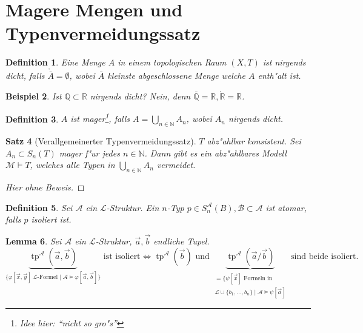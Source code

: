 \documentclass[a4paper,12pt,numbers=noenddot,parskip=full]{scrartcl}
\newcommand{\setN}{\mathbb{N}}
\newcommand{\setQ}{\mathbb{Q}}
\newcommand{\setR}{\mathbb{R}}
\newcommand{\scrL}{\mathcal{L}}
\newcommand{\scrA}{\mathcal{A}}
\newcommand{\scrB}{\mathcal{B}}
\newcommand{\scrM}{\mathcal{M}}
\DeclareMathOperator{\typ}{tp}
\theoremstyle{dotless}
\newtheorem{theorem}{Satz}[section]
\newtheorem{lemma}[theorem]{Lemma}
\newtheorem{definition}[theorem]{Definition}
\newtheorem{example}[theorem]{Beispiel}
\begin{document}
\section{Magere Mengen und Typenvermeidungssatz}
\begin{definition}
	Eine Menge $A$ in einem topologischen Raum $(X,T)$ ist \emph{nirgends dicht}, falls $\mathring{\bar{A}}=\emptyset$, wobei $\bar{A}$ kleinste abgeschlossene Menge welche $A$ enth"alt ist.
\end{definition}
\begin{example}
	Ist $\setQ \subset \setR$ nirgends dicht? Nein, denn $\bar{\setQ} = \setR, \mathring{\setR} = \setR$.
\end{example}
\begin{definition}
	$A$ ist \emph{mager}\footnote{Idee hier: "`nicht so gro"s"'}, falls $A = \bigcup\limits_{n \in \setN} A_n$, wobei $A_n$ nirgends dicht.
\end{definition}
\begin{theorem}[Verallgemeinerter Typenvermeidungssatz]
	$T$ abz"ahlbar konsistent. Sei $A_n \subset S_n(T)$ mager f"ur jedes $n \in \setN$. Dann gibt es ein abz"ahlbares Modell $\scrM \models T$, welches alle Typen in $\bigcup\limits_{n \in \setN} A_n$ vermeidet.
\end{theorem}
\begin{proof}[Hier ohne Beweis]
\end{proof}
\begin{definition}
	Sei $\scrA$ ein $\scrL$-Struktur. Ein $n$-Typ $p \in S_n^\scrA (B), \scrB \subset \scrA$ ist \emph{atomar}, falls $p$ isoliert ist.
\end{definition}
\begin{lemma}
	Sei $\scrA$ ein $\scrL$-Struktur, $\vec{a}, \vec{b}$ endliche Tupel.
	\begin{equation*}
		\underbrace{\typ^\scrA(\vec{a},\vec{b}) }_{\{\varphi[\vec{x}, \vec{y}]~ \scrL \text{-Formel} \mid \scrA \models \varphi[\vec{a},\vec{b}] \}} \text{ ist isoliert} \Longleftrightarrow \typ^\scrA(\vec{b}) \text{ und } \underbrace{\typ^\scrA(\vec{a} / \vec{b})}_{\substack{= \{\psi[\vec{x}] \text{ Formeln in}\\ \scrL \cup \{b_1, \dots, b_n\} \mid \scrA \models \psi [\vec{a}]}} \text{ sind beide isoliert.}
	\end{equation*}
\end{lemma}
\end{document}
